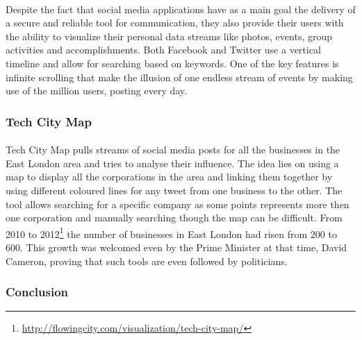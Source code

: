 \documentclass{l4proj}
\begin{document}
\paragraph{}
Despite the fact that social media applications have as a main goal the delivery of a secure and reliable tool for communication, they also provide their users with the ability to visualize their personal data streams like photos, events, group activities and accomplishments. Both Facebook and Twitter use a vertical timeline and allow for searching based on keywords. One of the key features is infinite scrolling that make the illusion of one endless stream of events by making use of the million users, posting every day. 

\subsubsection{Tech City Map}
\paragraph{}
Tech City Map pulls streams of social media posts for all the businesses in the East London area and tries to analyse their influence. The idea lies on using a map to display all the corporations in the area and linking them together by using different coloured lines for any tweet from one business to the other. The tool allows searching for a specific company as some points represents more then one corporation and manually searching though the map can be difficult. From 2010 to 2012\footnote{\url{http://flowingcity.com/visualization/tech-city-map/}} the number of businesses in East London had risen from 200 to 600. This growth was welcomed even by the Prime Minister at that time, David Cameron, proving that such tools are even followed by politicians. 

\subsubsection{Conclusion}
\label{subsubsec:conclusion}
\end{document}
